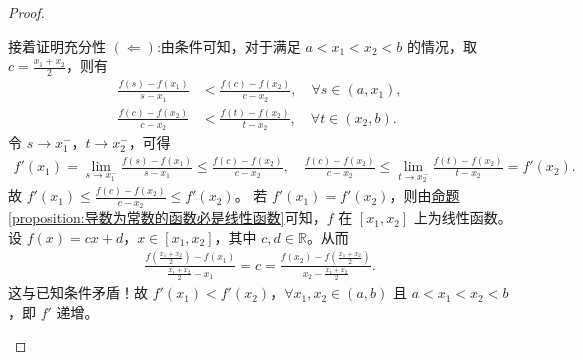 \documentclass[../../main.tex]{subfiles}%
\begin{document}
\begin{proof}
\begin{enumerate}[(1)]
接着证明充分性 $(\Leftarrow)$:由条件可知，对于满足 \(a < x_1 < x_2 < b\) 的情况，取 \(c = \frac{x_1 + x_2}{2}\)，则有
\begin{align*}
\frac{f(s) - f(x_1)}{s - x_1} &< \frac{f(c) - f(x_2)}{c - x_2}, \quad \forall s \in (a, x_1), \\
\frac{f(c) - f(x_2)}{c - x_2} &< \frac{f(t) - f(x_2)}{t - x_2}, \quad \forall t \in (x_2, b).
\end{align*}
令 \(s \to x_1^-\)，\(t \to x_2^-\)，可得
\begin{align*}
f'(x_1) = \lim_{s \to x_1^-} \frac{f(s) - f(x_1)}{s - x_1} \leqslant \frac{f(c) - f(x_2)}{c - x_2}, \quad
\frac{f(c) - f(x_2)}{c - x_2} \leqslant \lim_{t \to x_2^-} \frac{f(t) - f(x_2)}{t - x_2} = f'(x_2).
\end{align*}
故 \(f'(x_1) \leqslant \frac{f(c) - f(x_2)}{c - x_2} \leqslant f'(x_2)\)。
若 \(f'(x_1) = f'(x_2)\)，则由\hyperref[proposition:导数为常数的函数必是线性函数]{命题\ref{proposition:导数为常数的函数必是线性函数}}可知，\(f\) 在 \([x_1, x_2]\) 上为线性函数。设 \(f(x) = cx + d\)，\(x \in [x_1, x_2]\)，其中 \(c, d \in \mathbb{R}\)。从而
\begin{align*}
\frac{f\left(\frac{x_1 + x_2}{2}\right) - f(x_1)}{\frac{x_1 + x_2}{2} - x_1} = c = \frac{f(x_2) - f\left(\frac{x_1 + x_2}{2}\right)}{x_2 - \frac{x_1 + x_2}{2}}.
\end{align*}
这与已知条件矛盾！故 \(f'(x_1) < f'(x_2)\)，\(\forall x_1, x_2 \in (a, b)\) 且 \(a < x_1 < x_2 < b\)，即 \(f'\) 递增。   
\end{enumerate}

\end{proof}
\end{document}

